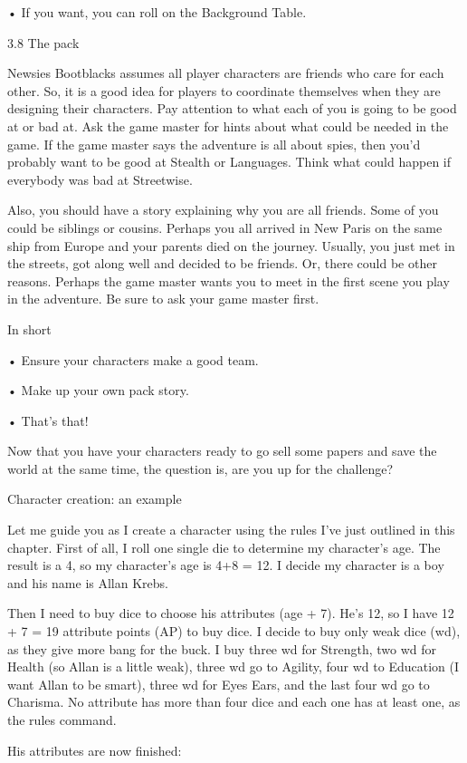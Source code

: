 • If you want, you can roll on the Background Table.

3.8 The pack

Newsies  Bootblacks assumes all player characters are friends who care for each other. So, it is a good idea for players to coordinate themselves when they are designing their characters. Pay attention to what each of you is going to be good at or bad at. Ask the game master for hints about what could be needed in the game. If the game master says the adventure is all about spies, then you'd probably want to be good at Stealth or Languages. Think what could happen if everybody was bad at Streetwise.

Also, you should have a story explaining why you are all friends. Some of you could be siblings or cousins. Perhaps you all arrived in New Paris on the same ship from Europe and your parents died on the journey. Usually, you just met in the streets, got along well and decided to be friends. Or, there could be other reasons. Perhaps the game master wants you to meet in the first scene you play in the adventure. Be sure to ask your game master first.

In short

• Ensure your characters make a good team.

• Make up your own pack story.

• That's that!

Now that you have your characters ready to go sell some papers and save the world at the same time, the question is, are you up for the challenge?

Character creation: an example

Let me guide you as I create a character using the rules I've just outlined in this chapter. First of all, I roll one single die to determine my character's age. The result is a 4, so my character's age is 4+8 = 12. I decide my character is a boy and his name is Allan Krebs.

Then I need to buy dice to choose his attributes (age + 7). He's 12, so I have 12 + 7 = 19 attribute points (AP) to buy dice. I decide to buy only weak dice (wd), as they give more bang for the buck. I buy three wd for Strength, two wd for Health (so Allan is a little weak), three wd go to Agility, four wd to Education (I want Allan to be smart), three wd for Eyes  Ears, and the last four wd go to Charisma. No attribute has more than four dice and each one has at least one, as the rules command.

His attributes are now finished:

